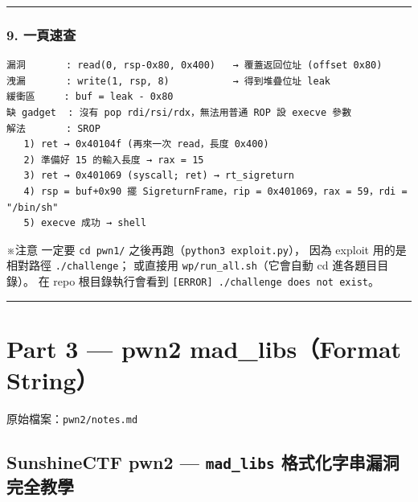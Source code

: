 \documentclass[10pt,a4paper]{article}
\renewenvironment{quote}{%
  \begin{mdframed}[linewidth=0pt,innerleftmargin=0pt,innerrightmargin=0pt,
    innerbottommargin=0pt,innertopmargin=0pt,skipabove=0.55em,skipbelow=0.55em,
    leftmargin=0.9em,rightmargin=0.4em,startcode={\color{quotebar}\vrule width 2.6pt},%
    endcode={}]%
  \itshape\color{black}%
}{%
  \end{mdframed}%
}
\begin{document}
\begin{center}\rule{0.5\linewidth}{0.5pt}\end{center}

\subsubsection{9. 一頁速查}\label{ux4e00ux9801ux901fux67e5}

\begin{Verbatim}[breaklines=true,breakanywhere=true,breakautoindent=false,fontsize=\fontsize{7.0}{9.5}\selectfont]
漏洞       : read(0, rsp-0x80, 0x400)   → 覆蓋返回位址 (offset 0x80)
洩漏       : write(1, rsp, 8)           → 得到堆疊位址 leak
緩衝區     : buf = leak - 0x80
缺 gadget  : 沒有 pop rdi/rsi/rdx，無法用普通 ROP 設 execve 參數
解法       : SROP
   1) ret → 0x40104f (再來一次 read，長度 0x400)
   2) 準備好 15 的輸入長度 → rax = 15
   3) ret → 0x401069 (syscall; ret) → rt_sigreturn
   4) rsp = buf+0x90 擺 SigreturnFrame，rip = 0x401069，rax = 59，rdi = "/bin/sh"
   5) execve 成功 → shell
\end{Verbatim}

\begin{quote}
※注意 一定要 \texttt{cd\ \allowbreak{}pwn1/}
之後再跑（\texttt{python3\ \allowbreak{}exploit.\allowbreak{}py}）， 因為 exploit 用的是相對路徑
\texttt{./\allowbreak{}challenge}； 或直接用 \texttt{wp/\allowbreak{}run\_\allowbreak{}all.\allowbreak{}sh}（它會自動 cd
進各題目目錄）。 在 repo 根目錄執行會看到
\texttt{{[}ERROR{]}\ \allowbreak{}\textquotesingle{}\allowbreak{}./\allowbreak{}challenge\textquotesingle{}\allowbreak{}\ \allowbreak{}does\ \allowbreak{}not\ \allowbreak{}exist}。
\end{quote}

\begin{center}\rule{0.5\linewidth}{0.5pt}\end{center}

\section{Part 3 --- pwn2 mad\_libs（Format
String）}\label{part-3-pwn2-mad_libsformat-string}

\begin{quote}
原始檔案：\texttt{pwn2/\allowbreak{}notes.\allowbreak{}md}
\end{quote}

\subsection{\texorpdfstring{SunshineCTF pwn2 --- \texttt{mad\_\allowbreak{}libs}
格式化字串漏洞完全教學}{SunshineCTF pwn2 --- mad\_libs 格式化字串漏洞完全教學}}\label{sunshinectf-pwn2-mad_libs-ux683cux5f0fux5316ux5b57ux4e32ux6f0fux6d1eux5b8cux5168ux6559ux5b78}
\end{document}
